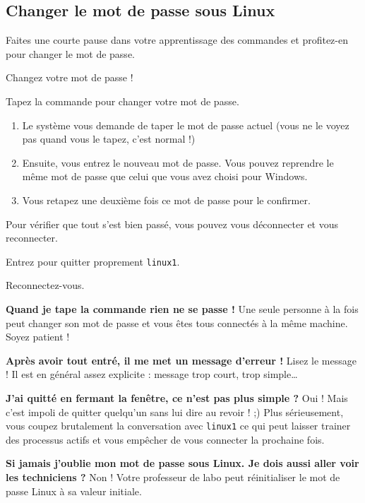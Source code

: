 \documentclass[a4paper,11pt]{style-esi/td}
\begin{document}
	\subsection{Changer le mot de passe sous Linux}

		Faites une courte pause dans votre apprentissage des commandes
		et profitez-en pour changer le mot de passe.

		\begin{Tutoriel}{Changez votre mot de passe !}
			\vspace{-1em}
			\begin{steps}
			\item Tapez la commande  pour changer votre mot de passe.
				\begin{enumerate}				
					\item 
						Le système vous demande de taper le mot de passe actuel 
						(vous ne le voyez pas quand vous le tapez, c'est normal !)
					\item 
						Ensuite, vous entrez le nouveau mot de passe.
						Vous pouvez reprendre le même mot de passe 
						que celui que vous avez choisi pour Windows.
					\item 
						Vous retapez une deuxième fois ce mot de passe pour le confirmer.
				\end{enumerate}
			\end{steps}
			Pour vérifier que tout s'est bien passé, 
			vous pouvez vous déconnecter et vous reconnecter.
			\begin{steps}
			\item Entrez  pour quitter proprement \verb_linux1_.
			\item Reconnectez-vous. 
			\end{steps}
		\end{Tutoriel}
			
		\bigskip
		\begin{faq}
			\textbf{Quand je tape la commande rien ne se passe !}
				Une seule personne à la fois peut changer son mot de passe 
				et vous êtes tous connectés à la même machine. 
				Soyez patient !

			\medskip	
			\textbf{Après avoir tout entré, il me met un message d'erreur !}
				Lisez le message ! Il est en général assez explicite : 
				message trop court, trop simple\dots

			\medskip
			\textbf{J'ai quitté en fermant la fenêtre, ce n'est pas plus simple ?}
				Oui ! Mais c'est impoli de quitter quelqu'un sans lui dire au revoir ! ;) 
				Plus sérieusement, vous coupez brutalement la conversation avec \texttt{linux1} 
				ce qui peut laisser trainer des processus actifs et vous empêcher de vous connecter la prochaine fois.

			\medskip
			\textbf{Si jamais j'oublie mon mot de passe sous Linux. Je dois aussi aller voir les techniciens ?}			
				Non ! Votre professeur de labo peut réinitialiser le mot de passe Linux à sa valeur initiale.
		\end{faq}
				
\end{document}
